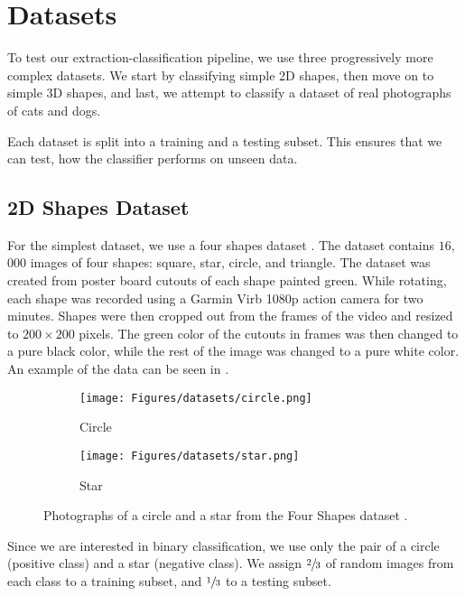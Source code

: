 \chapter{Datasets}\label{sec:datasets}
To test our extraction-classification pipeline, we use three progressively more complex datasets. We start by classifying simple 2D shapes, then move on to simple 3D shapes, and last, we attempt to classify a dataset of real photographs of cats and dogs.

Each dataset is split into a training and a testing subset. This ensures that we can test, how the classifier performs on unseen data.

\section{2D Shapes Dataset}\label{sec:2d-dataset}
For the simplest dataset, we use a four shapes dataset \cite{kaggleFourShapes}. The dataset contains $16$,$000$ images of four shapes: square, star, circle, and triangle. The dataset was created from poster board cutouts of each shape painted green. While rotating, each shape was recorded using a Garmin Virb 1080p action camera for two minutes. Shapes were then cropped out from the frames of the video and resized to $200\times200$ pixels. The green color of the cutouts in frames was then changed to a pure black color, while the rest of the image was changed to a pure white color. An example of the data can be seen in .
\begin{figure}[ht!]
    \centering
    \begin{subfigure}[t]{0.25\textwidth}
        \texttt{[image: Figures/datasets/circle.png]}
        \caption{Circle}
    \end{subfigure}
    \begin{subfigure}[t]{0.25\textwidth}
        \texttt{[image: Figures/datasets/star.png]}
        \caption{Star}
    \end{subfigure}
    \caption[Photographs of a circle and a star from the Four Shapes dataset]{Photographs of a circle and a star from the Four Shapes dataset \cite{kaggleFourShapes}.}
    \label{fig:four_shapes}
\end{figure}

Since we are interested in binary classification, we use only the pair of a circle (positive class) and a star (negative class). We assign $\sfrac{2}{3}$ of random images from each class to a training subset, and $\sfrac{1}{3}$ to a testing subset.

